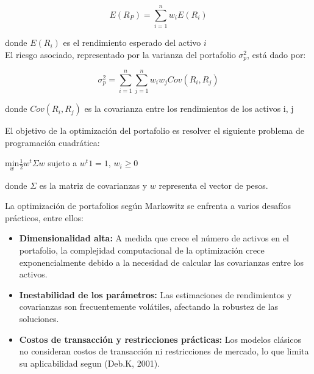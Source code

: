 \documentclass[9pt,a4paper,twoside]{rho-class/rho}
\begin{document}
            \begin{equation}
                \label{ec:ecuacion1}
            E\left({R}_{P}\right)=\sum _{i=1}^{n}{w}_{i}E\left({R}_{i}\right)
            \end{equation}
        
            donde $E\left({R}_{i}\right)$ es el rendimiento esperado del activo $i$
            \\
            
            El riesgo asociado, representado por la varianza del portafolio ${\sigma }^{2}_{p}$, está dado por:
        
            \begin{equation}
            {\sigma }^{2}_{p}=\sum _{i=1}^{n}\sum _{j=1}^{n}{w}_{i}{w}_{j}Cov\left({R}_{i},{R}_{j}\right)
            \end{equation}
        
            donde $Cov\left({R}_{i},{R}_{j}\right)$ es la covarianza entre los rendimientos de los activos {i}, {j}
        
            \vspace{2mm}El objetivo de la optimización del portafolio es resolver el siguiente problema de programación cuadrática:
        
            \begin{center}
                $\underset{w}{\mathrm{min}}\frac{1}{2}{w}^{t}\Sigma w$ sujeto a ${w}^{t}1=1$, ${w}_{i}\ge 0$     
            \end{center}
        
            \vspace{2mm}donde $\Sigma $ es la matriz de covarianzas y ${w}$ representa el vector de pesos.
        
            \vspace{2mm}La optimización de portafolios según Markowitz se enfrenta a varios desafíos prácticos, entre ellos:
        
            \begin{itemize}
                \item \textbf{Dimensionalidad alta:} A medida que crece el número de  activos en el portafolio, la complejidad computacional de la optimización crece exponencialmente debido a la necesidad de calcular las covarianzas entre los activos.
                \item \textbf{Inestabilidad de los parámetros:} Las estimaciones de rendimientos y covarianzas son frecuentemente volátiles, afectando la robustez de las soluciones.
                \item \textbf{Costos de transacción y restricciones prácticas:} Los modelos clásicos no consideran costos de transacción ni restricciones de mercado, lo que limita su aplicabilidad segun (Deb.K, 2001)\cite{Deb2001}.
            \end{itemize}
        
\end{document}
